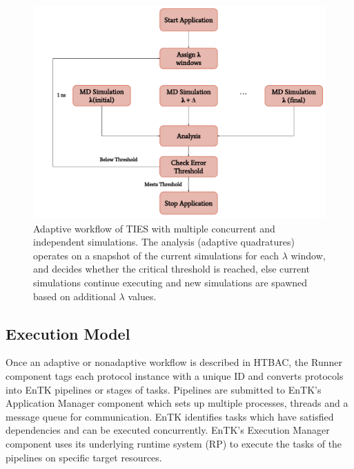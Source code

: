 \begin{figure}
  \centering
  \includegraphics[width=\columnwidth]{figures/adaptive_TIES_workflow_diagram.pdf}
  \caption{Adaptive workflow of TIES with multiple concurrent and independent
  simulations. The analysis (adaptive quadratures) operates on a snapshot of
  the current simulations for each $\lambda$ window, and decides whether the
  critical threshold is reached, else current simulations continue executing
  and new simulations are spawned based on additional $\lambda$ values.}
\label{fig:adaptive_ties}
\end{figure}

\subsection{Execution Model}

Once an adaptive or nonadaptive workflow is described in HTBAC, the Runner
component tags each protocol instance with a unique ID and converts protocols
into EnTK pipelines or stages of tasks. Pipelines are submitted to EnTK's
Application Manager component which sets up multiple processes, threads and a
message queue for communication. EnTK identifies tasks which have satisfied
dependencies and can be executed concurrently. EnTK's Execution Manager
component uses its underlying runtime system (RP) to execute the tasks of the
pipelines on specific target resources.



